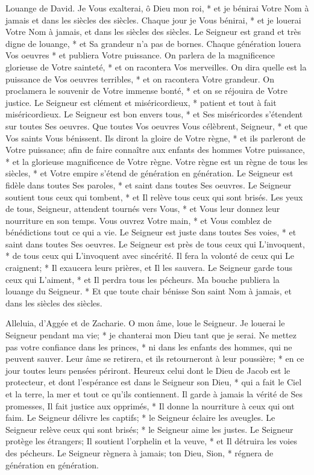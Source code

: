 Louange de David. Je Vous exalterai, ô Dieu mon roi, * et je bénirai Votre Nom à jamais et dans les siècles des siècles.
Chaque jour je Vous bénirai, * et je louerai Votre Nom à jamais, et dans les siècles des siècles.
Le Seigneur est grand et très digne de louange, * et Sa grandeur n'a pas de bornes.
Chaque génération louera Vos oeuvres * et publiera Votre puissance.
On parlera de la magnificence glorieuse de Votre sainteté, * et on racontera Vos merveilles.
On dira quelle est la puissance de Vos oeuvres terribles, * et on racontera Votre grandeur.
On proclamera le souvenir de Votre immense bonté, * et on se réjouira de Votre justice.
Le Seigneur est clément et miséricordieux, * patient et tout à fait miséricordieux.
Le Seigneur est bon envers tous, * et Ses miséricordes s'étendent sur toutes Ses oeuvres.
Que toutes Vos oeuvres Vous célèbrent, Seigneur, * et que Vos saints Vous bénissent.
Ils diront la gloire de Votre règne, * et ils parleront de Votre puissance;
afin de faire connaître aux enfants des hommes Votre puissance, * et la glorieuse magnificence de Votre règne.
Votre règne est un règne de tous les siècles, * et Votre empire s'étend de génération en génération. Le Seigneur est fidèle dans toutes Ses paroles, * et saint dans toutes Ses oeuvres.
Le Seigneur soutient tous ceux qui tombent, * et Il relève tous ceux qui sont brisés.
Les yeux de tous, Seigneur, attendent tournés vers Vous, * et Vous leur donnez leur nourriture en son temps.
Vous ouvrez Votre main, * et Vous comblez de bénédictions tout ce qui a vie.
Le Seigneur est juste dans toutes Ses voies, * et saint dans toutes Ses oeuvres.
Le Seigneur est près de tous ceux qui L'invoquent, * de tous ceux qui L'invoquent avec sincérité.
Il fera la volonté de ceux qui Le craignent; * Il exaucera leurs prières, et Il les sauvera.
Le Seigneur garde tous ceux qui L'aiment, * et Il perdra tous les pécheurs.
Ma bouche publiera la louange du Seigneur. * Et que toute chair bénisse Son saint Nom à jamais, et dans les siècles des siècles.

Alleluia, d'Aggée et de Zacharie.
O mon âme, loue le Seigneur. Je louerai le Seigneur pendant ma vie; * je chanterai mon Dieu tant que je serai. Ne mettez pas votre confiance dans les princes, *
ni dans les enfants des hommes, qui ne peuvent sauver.
Leur âme se retirera, et ils retourneront à leur poussière; * en ce jour toutes leurs pensées périront.
Heureux celui dont le Dieu de Jacob est le protecteur, et dont l'espérance est dans le Seigneur son Dieu, *
qui a fait le Ciel et la terre, la mer et tout ce qu'ils contiennent.
Il garde à jamais la vérité de Ses promesses, Il fait justice aux opprimés, * Il donne la nourriture à ceux qui ont faim. Le Seigneur délivre les captifs; *
le Seigneur éclaire les aveugles. Le Seigneur relève ceux qui sont brisés; * le Seigneur aime les justes.
Le Seigneur protège les étrangers; Il soutient l'orphelin et la veuve, * et Il détruira les voies des pécheurs.
Le Seigneur règnera à jamais; ton Dieu, Sion, * régnera de génération en génération.

